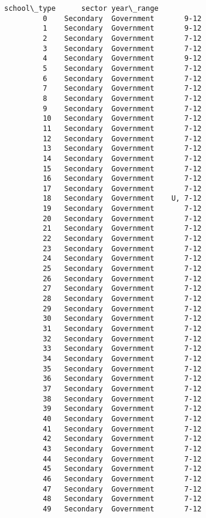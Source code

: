 \documentclass[11pt]{article}
\begin{document}
\begin{Verbatim}[commandchars=\\\{\}]
            school\_type      sector year\_range  
         0    Secondary  Government       9-12  
         1    Secondary  Government       9-12  
         2    Secondary  Government       7-12  
         3    Secondary  Government       7-12  
         4    Secondary  Government       9-12  
         5    Secondary  Government       7-12  
         6    Secondary  Government       7-12  
         7    Secondary  Government       7-12  
         8    Secondary  Government       7-12  
         9    Secondary  Government       7-12  
         10   Secondary  Government       7-12  
         11   Secondary  Government       7-12  
         12   Secondary  Government       7-12  
         13   Secondary  Government       7-12  
         14   Secondary  Government       7-12  
         15   Secondary  Government       7-12  
         16   Secondary  Government       7-12  
         17   Secondary  Government       7-12  
         18   Secondary  Government    U, 7-12  
         19   Secondary  Government       7-12  
         20   Secondary  Government       7-12  
         21   Secondary  Government       7-12  
         22   Secondary  Government       7-12  
         23   Secondary  Government       7-12  
         24   Secondary  Government       7-12  
         25   Secondary  Government       7-12  
         26   Secondary  Government       7-12  
         27   Secondary  Government       7-12  
         28   Secondary  Government       7-12  
         29   Secondary  Government       7-12  
         30   Secondary  Government       7-12  
         31   Secondary  Government       7-12  
         32   Secondary  Government       7-12  
         33   Secondary  Government       7-12  
         34   Secondary  Government       7-12  
         35   Secondary  Government       7-12  
         36   Secondary  Government       7-12  
         37   Secondary  Government       7-12  
         38   Secondary  Government       7-12  
         39   Secondary  Government       7-12  
         40   Secondary  Government       7-12  
         41   Secondary  Government       7-12  
         42   Secondary  Government       7-12  
         43   Secondary  Government       7-12  
         44   Secondary  Government       7-12  
         45   Secondary  Government       7-12  
         46   Secondary  Government       7-12  
         47   Secondary  Government       7-12  
         48   Secondary  Government       7-12  
         49   Secondary  Government       7-12  
\end{Verbatim}
            
\end{document}
